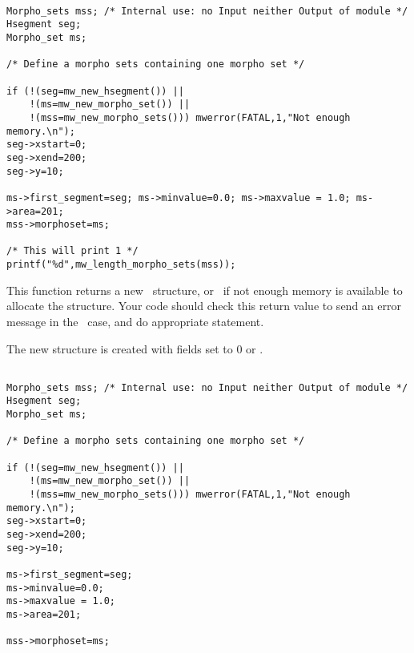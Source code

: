\Next
\Example
\begin{verbatim}

Morpho_sets mss; /* Internal use: no Input neither Output of module */
Hsegment seg;
Morpho_set ms;

/* Define a morpho sets containing one morpho set */

if (!(seg=mw_new_hsegment()) ||
    !(ms=mw_new_morpho_set()) ||
    !(mss=mw_new_morpho_sets())) mwerror(FATAL,1,"Not enough memory.\n");
seg->xstart=0; 
seg->xend=200;
seg->y=10;

ms->first_segment=seg; ms->minvalue=0.0; ms->maxvalue = 1.0; ms->area=201;
mss->morphoset=ms;

/* This will print 1 */
printf("%d",mw_length_morpho_sets(mss));
\end{verbatim}

\newpage %


\Description
This function returns a new \msets\ structure, or \Null\ if not enough 
memory is available to allocate the structure. 
Your code should check this return value to send an error message in the 
\Null\ case, and do appropriate statement.

The new structure is created with fields set to $0$ or \Null.

\Next
\Example
\begin{verbatim}

Morpho_sets mss; /* Internal use: no Input neither Output of module */
Hsegment seg;
Morpho_set ms;

/* Define a morpho sets containing one morpho set */

if (!(seg=mw_new_hsegment()) ||
    !(ms=mw_new_morpho_set()) ||
    !(mss=mw_new_morpho_sets())) mwerror(FATAL,1,"Not enough memory.\n");
seg->xstart=0; 
seg->xend=200;
seg->y=10;

ms->first_segment=seg;
ms->minvalue=0.0;
ms->maxvalue = 1.0;
ms->area=201;

mss->morphoset=ms;

\end{verbatim}

\newpage %


